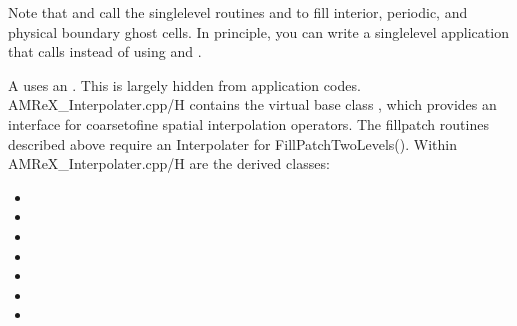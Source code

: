 \documentclass[letterpaper,10pt,english]{sphinxmanual}
\begin{document}
\sphinxAtStartPar
Note that  and  call the
single\sphinxhyphen{}level routines  and 
to fill interior, periodic, and physical boundary ghost cells.  In principle, you can
write a single\sphinxhyphen{}level application that calls  instead
of using  and .

\sphinxAtStartPar
A  uses an . This is largely hidden from application codes.
AMReX\_Interpolater.cpp/H contains the virtual base class , which provides
an interface for coarse\sphinxhyphen{}to\sphinxhyphen{}fine spatial interpolation operators. The fillpatch routines described
above require an Interpolater for FillPatchTwoLevels().
Within AMReX\_Interpolater.cpp/H are the derived classes:
\begin{itemize}
\item {} 
\sphinxAtStartPar
{}

\item {} 
\sphinxAtStartPar
{}

\item {} 
\sphinxAtStartPar
{}

\item {} 
\sphinxAtStartPar
{}

\item {} 
\sphinxAtStartPar
{}

\item {} 
\sphinxAtStartPar
{}

\item {} 
\sphinxAtStartPar
{}

\end{itemize}
\end{document}
